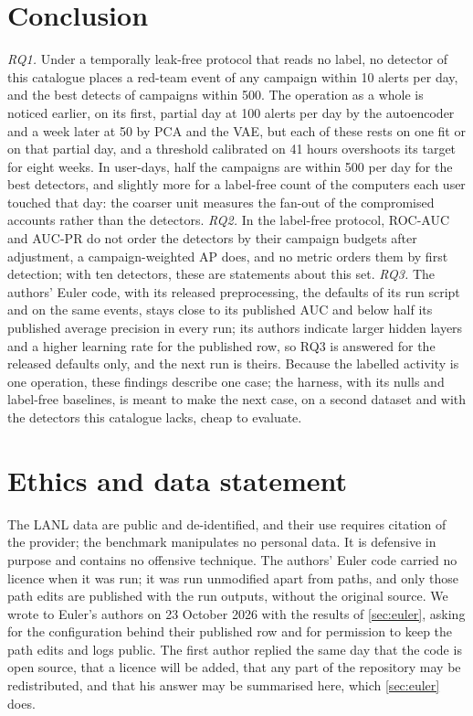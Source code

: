 \documentclass[11pt,a4paper]{article}
\begin{document}
\section{Conclusion}
\label{sec:conclusion}
\emph{RQ1.} Under a temporally leak-free protocol that reads no label, no detector of this catalogue places a red-team event of any campaign within 10 alerts per day, and the best detects \HarmVaeRecallFiveHundredCount{} of \HarmTestCampaigns{} campaigns within 500. The operation as a whole is noticed earlier, on its first, partial day at 100 alerts per day by the autoencoder and a week later at 50 by PCA and the VAE, but each of these rests on one fit or on that partial day, and a threshold calibrated on 41 hours overshoots its target for eight weeks. In user-days, half the campaigns are within 500 per day for the best detectors, and slightly more for a label-free count of the computers each user touched that day: the coarser unit measures the fan-out of the compromised accounts rather than the detectors. \emph{RQ2.} In the label-free protocol, ROC-AUC and AUC-PR do not order the detectors by their campaign budgets after adjustment, a campaign-weighted AP does, and no metric orders them by first detection; with ten detectors, these are statements about this set. \emph{RQ3.} The authors' Euler code, with its released preprocessing, the defaults of its run script and on the same events, stays close to its published AUC and below half its published average precision in every run; its authors indicate larger hidden layers and a higher learning rate for the published row, so RQ3 is answered for the released defaults only, and the next run is theirs. Because the labelled activity is one operation, these findings describe one case; the harness, with its nulls and label-free baselines, is meant to make the next case, on a second dataset and with the detectors this catalogue lacks, cheap to evaluate.

\section*{Ethics and data statement}
The LANL data are public and de-identified, and their use requires citation of the provider; the benchmark manipulates no personal data. It is defensive in purpose and contains no offensive technique. The authors' Euler code carried no licence when it was run; it was run unmodified apart from paths, and only those path edits are published with the run outputs, without the original source. We wrote to Euler's authors on 23 October 2026 with the results of \cref{sec:euler}, asking for the configuration behind their published row and for permission to keep the path edits and logs public. The first author replied the same day that the code is open source, that a licence will be added, that any part of the repository may be redistributed, and that his answer may be summarised here, which \cref{sec:euler} does.
\end{document}
